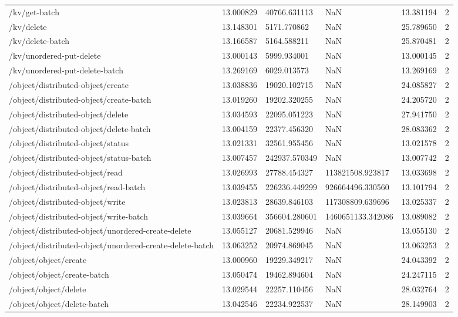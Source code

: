 \begin{tabularx}{\linewidth}{XXXXXX}
/kv/get-batch & 13.000829 & 40766.631113 & NaN & 13.381194 & 2 \\
/kv/delete & 13.148301 & 5171.770862 & NaN & 25.789650 & 2 \\
/kv/delete-batch & 13.166587 & 5164.588211 & NaN & 25.870481 & 2 \\
/kv/unordered-put-delete & 13.000143 & 5999.934001 & NaN & 13.000145 & 2 \\
/kv/unordered-put-delete-batch & 13.269169 & 6029.013573 & NaN & 13.269169 & 2 \\
/object/distributed-object/create & 13.038836 & 19020.102715 & NaN & 24.085827 & 2 \\
/object/distributed-object/create-batch & 13.019260 & 19202.320255 & NaN & 24.205720 & 2 \\
/object/distributed-object/delete & 13.034593 & 22095.051223 & NaN & 27.941750 & 2 \\
/object/distributed-object/delete-batch & 13.004159 & 22377.456320 & NaN & 28.083362 & 2 \\
/object/distributed-object/status & 13.021331 & 32561.955456 & NaN & 13.021578 & 2 \\
/object/distributed-object/status-batch & 13.007457 & 242937.570349 & NaN & 13.007742 & 2 \\
/object/distributed-object/read & 13.026993 & 27788.454327 & 113821508.923817 & 13.033698 & 2 \\
/object/distributed-object/read-batch & 13.039455 & 226236.449299 & 926664496.330560 & 13.101794 & 2 \\
/object/distributed-object/write & 13.023813 & 28639.846103 & 117308809.639696 & 13.025337 & 2 \\
/object/distributed-object/write-batch & 13.039664 & 356604.280601 & 1460651133.342086 & 13.089082 & 2 \\
/object/distributed-object/unordered-create-delete & 13.055127 & 20681.529946 & NaN & 13.055130 & 2 \\
/object/distributed-object/unordered-create-delete-batch & 13.063252 & 20974.869045 & NaN & 13.063253 & 2 \\
/object/object/create & 13.000960 & 19229.349217 & NaN & 24.043392 & 2 \\
/object/object/create-batch & 13.050474 & 19462.894604 & NaN & 24.247115 & 2 \\
/object/object/delete & 13.029544 & 22257.110456 & NaN & 28.032764 & 2 \\
/object/object/delete-batch & 13.042546 & 22234.922537 & NaN & 28.149903 & 2 \\

\end{tabularx}
